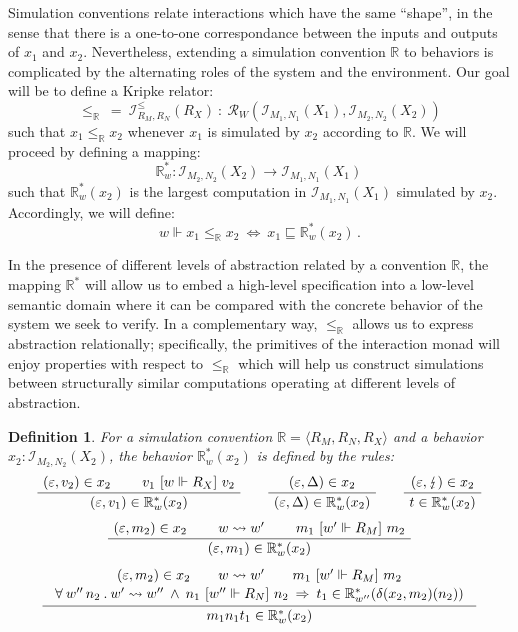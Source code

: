 \documentclass{article}
\newtheorem{definition}{Definition}
\newcommand{\ifr}[1]{\ [{#1}]\ }
\begin{document}
Simulation conventions relate interactions which have the same ``shape'',
in the sense that there is a one-to-one correspondance between
the inputs and outputs of $x_1$ and $x_2$.
Nevertheless,
extending a simulation convention $\mathbb{R}$ to behaviors
is complicated by the alternating roles of the system and the environment.
Our goal will be to define a Kripke relator:
\[ {\le}_\mathbb{R} \: = \:
   \mathcal{I}^\le_{R_M,R_N}(R_X) \: : \:
   \mathcal{R}_W(\mathcal{I}_{M_1,N_1}(X_1), \mathcal{I}_{M_2,N_2}(X_2)) \]
such that $x_1 \le_\mathbb{R} x_2$
whenever $x_1$ is simulated by $x_2$ according to $\mathbb{R}$.
We will proceed by defining a mapping:
\[ \mathbb{R}^*_w : \mathcal{I}_{M_2,N_2}(X_2) \rightarrow
                    \mathcal{I}_{M_1,N_1}(X_1) \, \]
such that $\mathbb{R}^*_w(x_2)$ is
the largest computation in $\mathcal{I}_{M_1,N_1}(X_1)$
simulated by $x_2$.
Accordingly,
we will define:
\[ w \Vdash x_1 \le_\mathbb{R} x_2 \: \Leftrightarrow \:
   x_1 \sqsubseteq \mathbb{R}^*_w(x_2) \,. \]

In the presence of different levels of abstraction
related by a convention $\mathbb{R}$,
the mapping $\mathbb{R}^*$ will allow us to embed a high-level specification
into a low-level semantic domain
where it can be compared with
the concrete behavior of the system we seek to verify.
In a complementary way, $\le_\mathbb{R}$
allows us to express abstraction relationally;
specifically, the primitives of the interaction monad
will enjoy properties with respect to $\le_\mathbb{R}$
which will help us construct
simulations between
structurally similar computations
operating at different levels of abstraction.

\begin{definition}
For a simulation convention $\mathbb{R} = \langle R_M, R_N, R_X \rangle$
and a behavior $x_2 : \mathcal{I}_{M_2, N_2}(X_2)$,
the behavior $\mathbb{R}^*_w(x_2)$ is defined by the rules:
\begin{gather*}
  \AxiomC{$(\varepsilon, v_2) \in x_2$}
  \AxiomC{$v_1 \ifr{w \Vdash R_X} v_2$}
  \BinaryInfC{$(\varepsilon, v_1) \in \mathbb{R}^*_w(x_2)$}
  \DisplayProof
  \qquad
  \AxiomC{$(\varepsilon, \Delta) \in x_2$}
  \UnaryInfC{$(\varepsilon, \Delta) \in \mathbb{R}^*_w(x_2)$}
  \DisplayProof
  \qquad
  \AxiomC{$(\varepsilon, \lightning) \in x_2$}
  \UnaryInfC{$t \in \mathbb{R}^*_w(x_2)$}
  \DisplayProof
  \\[1ex]
  \AxiomC{$(\varepsilon, m_2) \in x_2$}
  \AxiomC{$w \leadsto w'$}
  \AxiomC{$m_1 \ifr{w' \Vdash R_M} m_2$}
  \TrinaryInfC{$(\varepsilon, m_1) \in \mathbb{R}^*_w(x_2)$}
  \DisplayProof
  \\[1ex]
  \AxiomC{$
    \begin{array}{c}
      (\varepsilon, m_2) \in x_2 \qquad
      w \leadsto w' \qquad
      m_1 \ifr{w' \Vdash R_M} m_2
      \\[.3ex]
      \forall \: w'' \, n_2 \:.\:
        w' \leadsto w'' \: \wedge \:
        n_1 \ifr{w'' \Vdash R_N} n_2 \: \Rightarrow \:
        t_1 \in \mathbb{R}^*_{w''}(\delta(x_2, m_2)(n_2))
    \end{array}$}
  \UnaryInfC{$m_1 n_1 t_1 \in \mathbb{R}^*_w(x_2)$}
  \DisplayProof
\end{gather*}
\end{definition}
\end{document}
